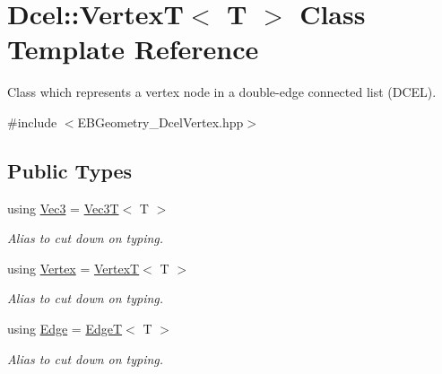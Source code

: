 \hypertarget{classDcel_1_1VertexT}{}\section{Dcel\+:\+:VertexT$<$ T $>$ Class Template Reference}
\label{classDcel_1_1VertexT}


Class which represents a vertex node in a double-\/edge connected list (D\+C\+EL).  




{\ttfamily \#include $<$E\+B\+Geometry\+\_\+\+Dcel\+Vertex.\+hpp$>$}

\subsection*{Public Types}
\begin{DoxyCompactItemize}
\item 
\mbox{\label{classDcel_1_1VertexT_a6e073dc7426756edef5594816be6e7c7}} 
using \hyperlink{classDcel_1_1VertexT_a6e073dc7426756edef5594816be6e7c7}{Vec3} = \hyperlink{classVec3T}{Vec3T}$<$ T $>$
\begin{DoxyCompactList}\small\item\em Alias to cut down on typing. \end{DoxyCompactList}\item 
\mbox{\label{classDcel_1_1VertexT_a2c8a221a9f03e9bafa891bd0759b4f8f}} 
using \hyperlink{classDcel_1_1VertexT_a2c8a221a9f03e9bafa891bd0759b4f8f}{Vertex} = \hyperlink{classDcel_1_1VertexT}{VertexT}$<$ T $>$
\begin{DoxyCompactList}\small\item\em Alias to cut down on typing. \end{DoxyCompactList}\item 
\mbox{\label{classDcel_1_1VertexT_abe1079747424916a164ec68b46333fc3}} 
using \hyperlink{classDcel_1_1VertexT_abe1079747424916a164ec68b46333fc3}{Edge} = \hyperlink{classDcel_1_1EdgeT}{EdgeT}$<$ T $>$
\begin{DoxyCompactList}\small\item\em Alias to cut down on typing. \end{DoxyCompactList}\item 
\mbox{\label{classDcel_1_1VertexT_a455510a8591a4e0f235b2049deb96e08}} 

\end{DoxyCompactItemize}
